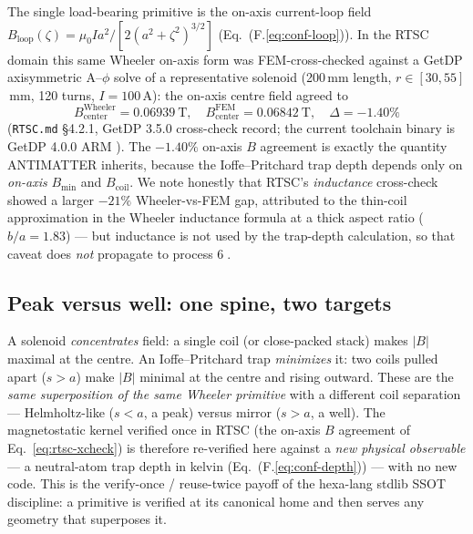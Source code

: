 The single load-bearing primitive is the on-axis current-loop field
$B_{\mathrm{loop}}(\zeta)=\mu_0 I a^2/[2(a^2+\zeta^2)^{3/2}]$
(Eq.~(F.\ref{eq:conf-loop})). In the RTSC domain this same Wheeler on-axis
form was FEM-cross-checked against a GetDP axisymmetric A--$\phi$ solve of a
representative solenoid (200\,mm length, $r\in[30,55]$\,mm, 120 turns,
$I=100$\,A): the on-axis centre field agreed to
\begin{equation}
B_{\mathrm{center}}^{\mathrm{Wheeler}} = 0.06939\ \mathrm{T},
\quad
B_{\mathrm{center}}^{\mathrm{FEM}} = 0.06842\ \mathrm{T},
\quad
\Delta = -1.40\%
\label{eq:rtsc-xcheck}
\end{equation}
(\texttt{RTSC.md} \S4.2.1, GetDP 3.5.0 cross-check record; the current toolchain
binary is GetDP 4.0.0 ARM \citep{getdp}). The $-1.40\%$ on-axis $B$ agreement
is exactly the quantity ANTIMATTER inherits, because the Ioffe--Pritchard
trap depth depends only on \emph{on-axis} $B_{\min}$ and $B_{\mathrm{coil}}$.
We note honestly that RTSC's \emph{inductance} cross-check showed a larger
$-21\%$ Wheeler-vs-FEM gap, attributed to the thin-coil approximation in the
Wheeler inductance formula at a thick aspect ratio ($b/a=1.83$) --- but
inductance is not used by the trap-depth calculation, so that caveat does
\emph{not} propagate to process \textcircled{\scriptsize 6}.

\subsection{Peak versus well: one spine, two targets}
\label{app:rtsc-peak-well}

A solenoid \emph{concentrates} field: a single coil (or close-packed stack)
makes $|B|$ maximal at the centre. An Ioffe--Pritchard trap \emph{minimizes}
it: two coils pulled apart ($s>a$) make $|B|$ minimal at the centre and rising
outward. These are the \emph{same superposition of the same Wheeler primitive}
with a different coil separation --- Helmholtz-like ($s<a$, a peak) versus
mirror ($s>a$, a well). The magnetostatic kernel verified once in RTSC (the
on-axis $B$ agreement of Eq.~\eqref{eq:rtsc-xcheck}) is therefore re-verified
here against a \emph{new physical observable} --- a neutral-atom trap depth in
kelvin (Eq.~(F.\ref{eq:conf-depth})) --- with no new code. This is the
verify-once / reuse-twice payoff of the hexa-lang stdlib SSOT discipline: a
primitive is verified at its canonical home and then serves any geometry that
superposes it.


